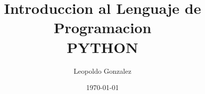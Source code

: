 \documentclass{beamer}
\title{Introduccion al Lenguaje de Programacion \\ PYTHON}
\author{Leopoldo Gonzalez}
\institute{Instituto de Neurobiologia \\ \textbf{UNAM}}
\date{\today}
\begin{document}
\frame{\titlepage}


%


%
\end{document}
